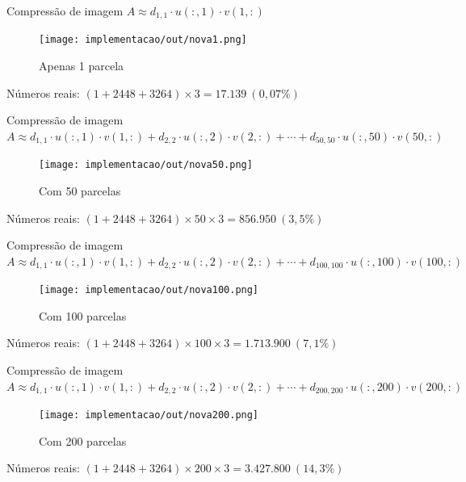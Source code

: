 \documentclass{beamer}
\begin{document}
\begin{frame}{Compress\~ao de imagem}{
    $A \approx d_{1,1}\cdot u(:,1)\cdot v(1,:)$}
    \pause
    \begin{figure}
        \centering
        \texttt{[image: implementacao/out/nova1.png]}
        \caption{Apenas 1 parcela}
    \end{figure}
    \begin{center}
        N\'umeros reais: $(1 + 2448 + 3264) \times 3 = 17.139\ (0,07\%)$
    \end{center}
\end{frame}

\begin{frame}{Compress\~ao de imagem}{
    $A \approx d_{1,1}\cdot u(:,1)\cdot v(1,:) + d_{2,2}\cdot
    u(:,2)\cdot v(2,:) +\cdots+ d_{50,50}\cdot u(:,50)\cdot v(50,:)$}
    \pause
    \begin{figure}
        \centering
        \texttt{[image: implementacao/out/nova50.png]}
        \caption{Com 50 parcelas}
    \end{figure}
    \begin{center}
        N\'umeros reais: $(1 + 2448 + 3264)\times 50 \times 3 = 856.950\ (3,5\%)$
    \end{center}
\end{frame}

\begin{frame}{Compress\~ao de imagem}{
    $A \approx d_{1,1}\cdot u(:,1)\cdot v(1,:) + d_{2,2}\cdot
    u(:,2)\cdot v(2,:) +\cdots+ d_{100,100}\cdot u(:,100)\cdot v(100,:)$}
    \begin{figure}
        \centering
        \texttt{[image: implementacao/out/nova100.png]}
        \caption{Com 100 parcelas}
    \end{figure}
    \begin{center}
        N\'umeros reais: $(1 + 2448 + 3264)\times 100 \times 3 = 1.713.900\ (7,1\%)$
    \end{center}
\end{frame}

\begin{frame}{Compress\~ao de imagem}{
    $A \approx d_{1,1}\cdot u(:,1)\cdot v(1,:) + d_{2,2}\cdot
    u(:,2)\cdot v(2,:) +\cdots+ d_{200,200}\cdot u(:,200)\cdot v(200,:)$}
    \begin{figure}
        \centering
        \texttt{[image: implementacao/out/nova200.png]}
        \caption{Com 200 parcelas}
    \end{figure}
    \begin{center}
        N\'umeros reais: $(1 + 2448 + 3264)\times 200 \times 3 = 3.427.800\ (14,3\%)$
    \end{center}
\end{frame}
\end{document}
